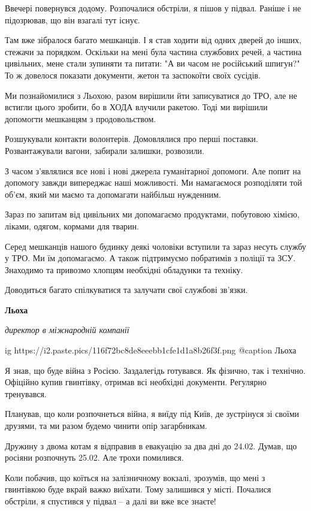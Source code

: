 \begin{multicols}{3}
Ввечері повернувся додому. Розпочалися обстріли, я пішов у підвал. Раніше і не
підозрював, що він взагалі тут існує.

Там вже зібралося багато мешканців. І я став ходити від одних дверей до інших,
стежачи за порядком. Оскільки на мені була частина службових речей, а частина
цивільних, мене стали зупиняти та питати: "А ви часом не російський шпигун?"
То ж довелося показати документи, жетон та заспокоїти своїх сусідів.

Ми познайомилися з Льохою, разом вирішили йти записуватися до ТРО, але не
встигли цього зробити, бо в ХОДА влучили ракетою. Тоді ми вирішили допомогти
мешканцям з продовольством.

Розшукували контакти волонтерів. Домовлялися про перші поставки. Розвантажували
вагони, забирали залишки, розвозили.

З часом з'являлися все нові і нові джерела гуманітарної допомоги. Але попит на
допомогу завжди випереджає наші можливості. Ми намагаємося розподіляти той
об'єм, який ми маємо та допомагати найбільш нужденним.

Зараз по запитам від цивільних ми допомагаємо продуктами, побутовою хімією,
ліками, одягом, кормами для тварин.

Серед мешканців нашого будинку деякі чоловіки вступили та зараз несуть службу у
ТРО. Ми їм допомагаємо. А також підтримуємо побратимів з поліції та ЗСУ.
Знаходимо та привозмо хлопцям  необхідні обладунки та техніку.

Доводиться багато спілкуватися та залучати свої службові зв'язки.

\textbf{Льоха}

\emph{директор в міжнародній компанії}

\ifcmt
  ig https://i2.paste.pics/116f72bc8de8eeebb1cfe1d1a8b26f3f.png
	@caption Льоха
\fi


Я знав, що буде війна з Росією. Заздалегідь готувався. Як фізично, так і
технічно. Офіційно купив гвинтівку, отримав всі необхідні документи. Регулярно
тренувався.

Планував, що коли розпочнеться війна, я виїду під Київ, де зустрінуся зі своїми
друзями, та ми разом будемо чинити опір загарбникам.

Дружину з двома котам я відправив в евакуацію за два дні до 24.02. Думав, що
росіяни розпочнуть 25.02. Але трохи помилився.

Коли побачив, що коїться на залізничному вокзалі, зрозумів, що мені з
гвинтівкою буде вкрай важко виїхати. Тому залишився у місті. Почалися обстріли,
я спустився у підвал – а далі ви вже все знаєте!

\end{multicols} %

